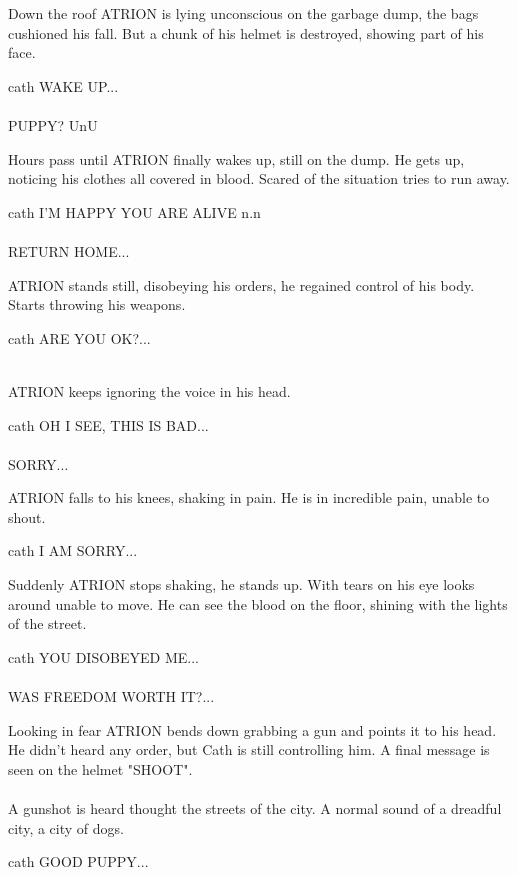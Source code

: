 \documentclass{screenplay}
\begin{document}
Down the roof ATRION is lying unconscious on the garbage dump, the bags cushioned his fall. But a chunk of his helmet is destroyed, showing part of his face. 

\begin{dialogue}{cath}
WAKE UP... \\~\\
PUPPY? UnU
\end{dialogue}

Hours pass until ATRION finally wakes up, still on the dump. He gets up, noticing his clothes all covered in blood. Scared of the situation tries to run away.

\begin{dialogue}{cath}
I'M HAPPY YOU ARE ALIVE n.n\\~\\
RETURN HOME...
\end{dialogue}
ATRION stands still, disobeying his orders, he regained control of his body. Starts throwing his weapons.
\begin{dialogue}{cath}
ARE YOU OK?...\\~\\
\end{dialogue}
ATRION keeps ignoring the voice in his head.

\begin{dialogue}{cath}
OH I SEE, THIS IS BAD...\\~\\
SORRY...
\end{dialogue}

ATRION falls to his knees, shaking in pain. He is in incredible pain, unable to shout.

\begin{dialogue}{cath}
I AM SORRY...
\end{dialogue}

Suddenly ATRION stops shaking, he stands up. With tears on his eye looks around unable to move. He can see the blood on the floor, shining with the lights of the street.

\begin{dialogue}{cath}
YOU DISOBEYED ME...\\~\\
WAS FREEDOM WORTH IT?...
\end{dialogue}

Looking in fear ATRION bends down grabbing a gun and points it to his head. He didn't heard any order, but Cath is still controlling him.
A final message is seen on the helmet "SHOOT".
\\~\\
A gunshot is heard thought the streets of the city. A normal sound of a dreadful city, a city of dogs.

\begin{dialogue}{cath}
GOOD PUPPY...
\end{dialogue}
\end{document}
